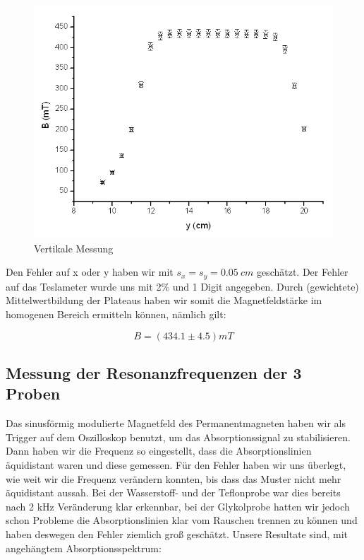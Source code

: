 \begin{figure}[H]
\centering \includegraphics[width=\textwidth]{Bilder/Hally.png}
\caption{Vertikale Messung}
\end{figure}

Den Fehler auf x oder y haben wir mit $s_x=s_y=0.05\ cm$ geschätzt. Der Fehler auf das Teslameter wurde uns mit 2\% und 1 Digit angegeben. Durch (gewichtete) Mittelwertbildung der Plateaus haben wir somit die Magnetfeldstärke im homogenen Bereich ermitteln können, nämlich gilt:

$$\boxed{B = (434.1 \pm 4.5) mT}$$

\subsection{Messung der Resonanzfrequenzen der 3 Proben}

Das sinusförmig modulierte Magnetfeld des Permanentmagneten haben wir als Trigger auf dem Oszilloskop benutzt, um das Absorptionssignal zu stabilisieren. Dann haben wir die Frequenz so eingestellt, dass die Absorptionslinien äquidistant waren und diese gemessen. Für den Fehler haben wir uns überlegt, wie weit wir die Frequenz verändern konnten, bis dass das Muster nicht mehr äquidistant aussah. Bei der Wasserstoff- und der Teflonprobe war dies bereits nach 2 kHz Veränderung klar erkennbar, bei der Glykolprobe hatten wir jedoch schon Probleme die Absorptionslinien klar vom Rauschen trennen zu können und haben deswegen den Fehler ziemlich groß geschätzt. Unsere Resultate sind, mit angehängtem Absorptionsspektrum:

